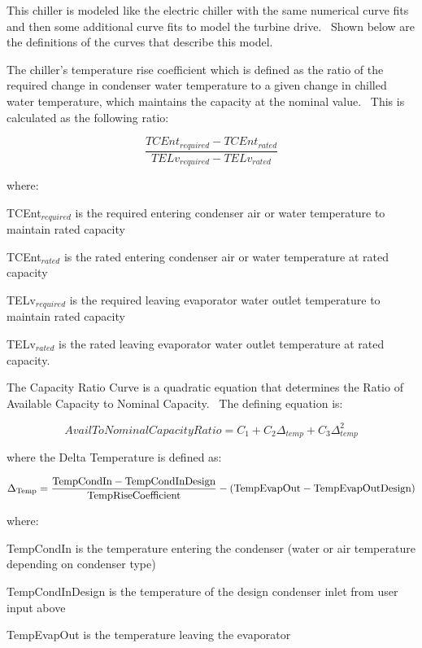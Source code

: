 This chiller is modeled like the electric chiller with the same numerical curve fits and then some additional curve fits to model the turbine drive.~ Shown below are the definitions of the curves that describe this model.

The chiller's temperature rise coefficient which is defined as the ratio of the required change in condenser water temperature to a given change in chilled water temperature, which maintains the capacity at the nominal value.~ This is calculated as the following ratio:

\begin{equation}
\frac{{TCEn{t_{required}} - TCEn{t_{rated}}}}{{TEL{v_{required}} - TEL{v_{rated}}}}
\end{equation}

where:

TCEnt\(_{required}\) is the required entering condenser air or water temperature to maintain rated capacity

TCEnt\(_{rated}\) is the rated entering condenser air or water temperature at rated capacity

TELv\(_{required}\) is the required leaving evaporator water outlet temperature to maintain rated capacity

TELv\(_{rated}\) is the rated leaving evaporator water outlet temperature at rated capacity.

The Capacity Ratio Curve is a quadratic equation that determines the Ratio of Available Capacity to Nominal Capacity.~ The defining equation is:

\begin{equation}
AvailToNominalCapacityRatio = {C_1} + {C_2}{\Delta_{temp}} + {C_3}\Delta_{temp}^2
\end{equation}

where the Delta Temperature is defined as:

\begin{equation}
{\Delta_{{\rm{Temp}}}} = \frac{{{\rm{TempCondIn  -  TempCondInDesign }}}}{{{\rm{TempRiseCoefficient}}}} - ({\rm{TempEvapOut  -  TempEvapOutDesign)}}
\end{equation}

where:

TempCondIn is the temperature entering the condenser (water or air temperature depending on condenser type)

TempCondInDesign is the temperature of the design condenser inlet from user input above

TempEvapOut is the temperature leaving the evaporator

